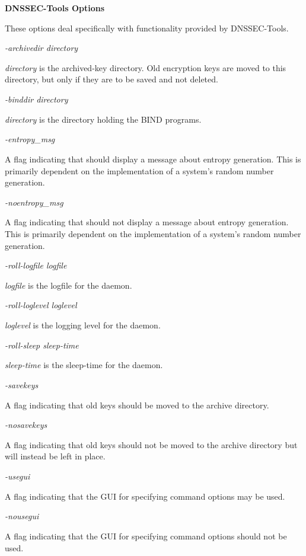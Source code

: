 {\bf DNSSEC-Tools Options}

These options deal specifically with functionality provided by DNSSEC-Tools.

\begin{description}

\item {\it -archivedir directory}\verb" "

{\it directory} is the archived-key directory.  Old encryption keys are moved
to this directory, but only if they are to be saved and not deleted.

\item {\it -binddir directory}\verb" "

{\it directory} is the directory holding the BIND programs.

\item {\it -entropy\_msg}\verb" "

A flag indicating that  should display a message about entropy
generation.  This is primarily dependent on the implementation of a system's
random number generation.

\item {\it -noentropy\_msg}\verb" "

A flag indicating that  should not display a message about
entropy generation.  This is primarily dependent on the implementation of
a system's random number generation.

\item {\it -roll-logfile logfile}\verb" "

{\it logfile} is the logfile for the  daemon.

\item {\it -roll-loglevel loglevel}\verb" "

{\it loglevel} is the logging level for the  daemon.

\item {\it -roll-sleep sleep-time}\verb" "

{\it sleep-time} is the sleep-time for the  daemon.

\item {\it -savekeys}\verb" "

A flag indicating that old keys should be moved to the archive directory.

\item {\it -nosavekeys}\verb" "

A flag indicating that old keys should not be moved to the archive directory
but will instead be left in place.

\item {\it -usegui}\verb" "

A flag indicating that the GUI for specifying command options may be used.

\item {\it -nousegui}\verb" "

A flag indicating that the GUI for specifying command options should not be
used.

\end{description}

